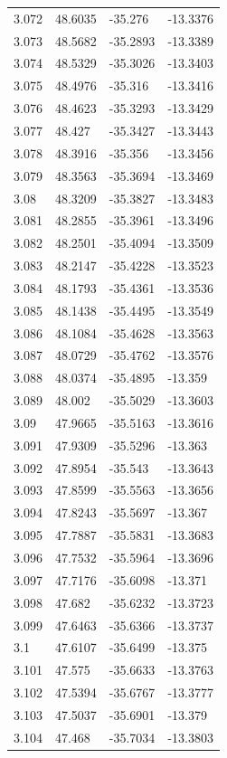 \begin{tabular}{llll}
3.072 & 48.6035 & -35.276 & -13.3376 \\
3.073 & 48.5682 & -35.2893 & -13.3389 \\
3.074 & 48.5329 & -35.3026 & -13.3403 \\
3.075 & 48.4976 & -35.316 & -13.3416 \\
3.076 & 48.4623 & -35.3293 & -13.3429 \\
3.077 & 48.427 & -35.3427 & -13.3443 \\
3.078 & 48.3916 & -35.356 & -13.3456 \\
3.079 & 48.3563 & -35.3694 & -13.3469 \\
3.08 & 48.3209 & -35.3827 & -13.3483 \\
3.081 & 48.2855 & -35.3961 & -13.3496 \\
3.082 & 48.2501 & -35.4094 & -13.3509 \\
3.083 & 48.2147 & -35.4228 & -13.3523 \\
3.084 & 48.1793 & -35.4361 & -13.3536 \\
3.085 & 48.1438 & -35.4495 & -13.3549 \\
3.086 & 48.1084 & -35.4628 & -13.3563 \\
3.087 & 48.0729 & -35.4762 & -13.3576 \\
3.088 & 48.0374 & -35.4895 & -13.359 \\
3.089 & 48.002 & -35.5029 & -13.3603 \\
3.09 & 47.9665 & -35.5163 & -13.3616 \\
3.091 & 47.9309 & -35.5296 & -13.363 \\
3.092 & 47.8954 & -35.543 & -13.3643 \\
3.093 & 47.8599 & -35.5563 & -13.3656 \\
3.094 & 47.8243 & -35.5697 & -13.367 \\
3.095 & 47.7887 & -35.5831 & -13.3683 \\
3.096 & 47.7532 & -35.5964 & -13.3696 \\
3.097 & 47.7176 & -35.6098 & -13.371 \\
3.098 & 47.682 & -35.6232 & -13.3723 \\
3.099 & 47.6463 & -35.6366 & -13.3737 \\
3.1 & 47.6107 & -35.6499 & -13.375 \\
3.101 & 47.575 & -35.6633 & -13.3763 \\
3.102 & 47.5394 & -35.6767 & -13.3777 \\
3.103 & 47.5037 & -35.6901 & -13.379 \\
3.104 & 47.468 & -35.7034 & -13.3803 \\

\end{tabular}
